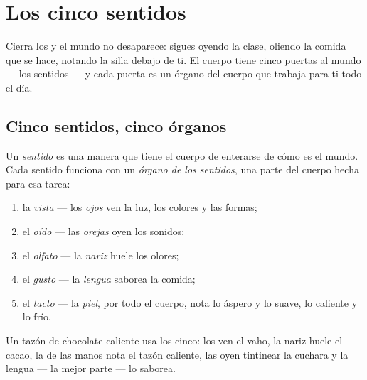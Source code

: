 \chapter{Los cinco sentidos}\label{ch:g1:the-five-senses}

Cierra los  y el mundo no desaparece: sigues oyendo la clase,
oliendo la comida que se hace, notando la silla debajo de ti. El
cuerpo tiene cinco puertas al mundo --- los sentidos --- y cada
puerta es un órgano del cuerpo que trabaja para ti todo el día.

\section{Cinco sentidos, cinco órganos}

\begin{definition}\label{def:g1:the-five-senses:sense}
Un \emph{sentido} es una manera que tiene el cuerpo de
enterarse de cómo es el mundo. Cada sentido funciona con un
\emph{órgano de los sentidos}, una parte
del cuerpo hecha para esa tarea:
\begin{enumerate}
  \item la \emph{vista} --- los \emph{ojos}
        ven la luz, los colores y las formas;
  \item el \emph{oído} --- las \emph{orejas}
        oyen los sonidos;
  \item el \emph{olfato} --- la \emph{nariz}
        huele los olores;
  \item el \emph{gusto} --- la \emph{lengua}
        saborea la comida;
  \item el \emph{tacto} --- la \emph{piel},
        por todo el cuerpo, nota lo áspero y lo suave, lo caliente y lo frío.
\end{enumerate}
\end{definition}

\begin{example}\label{ex:g1:the-five-senses:breakfast}
Un tazón de chocolate caliente usa los cinco: los  ven el vaho,
la nariz huele el cacao, la  de las manos nota el tazón caliente,
las  oyen tintinear la cuchara y la lengua --- la mejor parte
--- lo saborea.
\end{example}

